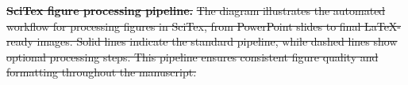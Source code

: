 \documentclass[preprint,review,12pt]{elsarticle}%
\providecommand{\DIFdeltex}[1]{{\protect\color{red}\sout{#1}}}                      %
\providecommand{\DIFdelFL}[1]{\DIFdel{#1}} %
\providecommand{\DIFdel}[1]{\texorpdfstring{\DIFdeltex{#1}}{}} %
\begin{document}
\begin{frontmatter}




{%
\textbf{\DIFdelFL{SciTex figure processing pipeline.}} %
\DIFdelFL{The diagram illustrates the automated workflow for processing figures in SciTex, from PowerPoint slides to final LaTeX-ready images. Solid lines indicate the standard pipeline, while dashed lines show optional processing steps. This pipeline ensures consistent figure quality and formatting throughout the manuscript.}}



\end{frontmatter}
\end{document}
